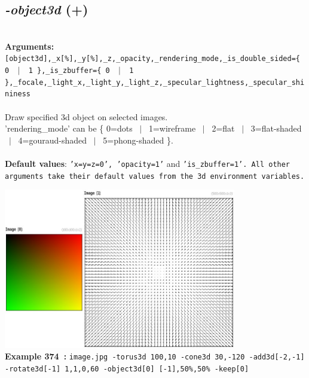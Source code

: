 \documentclass[a4paper,11pt,twoside]{book}
\begin{document}
\subsection{\emph{-object3d} (+)}\vspace*{-0.5em}
~\\\textbf{Arguments: } 
{\small \texttt{[object3d],\_x[\%],\_y[\%],\_z,\_opacity,\_rendering\_mode,\_is\_double\_sided=\{ 0 ~$|$~ 1 \},\_is\_zbuffer=\{ 0 ~$|$~ 1 \},\_focale,\_light\_x,\_light\_y,\_light\_z,\_specular\_lightness,\_specular\_shininess}}\\~\\
Draw specified 3d object on selected images.
~\\'rendering\_mode' can be \{ 0=dots ~$|$~ 1=wireframe ~$|$~ 2=flat ~$|$~ 3=flat-shaded ~$|$~ 4=gouraud-shaded ~$|$~ 5=phong-shaded \}.
~\\~\\\textbf{Default values}: {\small \texttt{'x=y=z=0', 'opacity=1'} and \texttt{'is\_zbuffer=1'. All other arguments take their default values from the 3d environment variables.}}
\begin{center}\includegraphics[keepaspectratio=true,height=7cm,width=\textwidth]{img/gmic_def374.jpg}\\
{\footnotesize \textbf{Example 374~:} \texttt{image.jpg -torus3d 100,10 -cone3d 30,-120 -add3d[-2,-1] -rotate3d[-1] 1,1,0,60 -object3d[0] [-1],50\%,50\% -keep[0]}}
\end{center}
\end{document}

